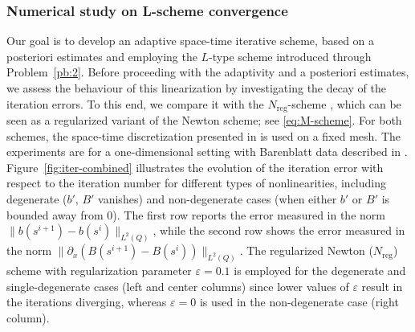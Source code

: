 \documentclass[review,11pt]{article}
\numberwithin{equation}{section}
\def \e  {\varepsilon}
\begin{document}
\subsubsection{Numerical study on L-scheme convergence}\label{sec:numerical_validation}
Our goal is to develop an adaptive space-time iterative scheme, based on a posteriori estimates and employing the $L$-type scheme introduced through Problem~\ref{pb:2}. Before proceeding with the adaptivity and a posteriori estimates, we assess the behaviour of this linearization by investigating the decay of the iteration errors. To this end, we compare it with the $N_{\mathrm{reg}}$-scheme
\cite{mitra2019modified,javed2025robust}, which can be seen as a regularized variant of the Newton scheme; see \eqref{eq:M-scheme}. For both schemes, the space-time discretization presented in  is used on a fixed mesh. The experiments are for a one-dimensional setting with Barenblatt data described in .
Figure~\ref{fig:iter-combined} illustrates the evolution of the iteration error with respect to the iteration number for different types of nonlinearities, including degenerate ($b'$, $B'$ vanishes) and non-degenerate cases (when either $b'$ or $B'$ is bounded away from 0). The first row reports the error measured in the norm $\|b(s^{i+1})-b(s^i)\|_{L^2(Q)}$, while the second row shows the error measured in the norm $\|\partial_x(B(s^{i+1})-B(s^i))\|_{L^2(Q)}$. The regularized Newton ($N_{\mathrm{reg}}$) scheme with regularization parameter $\e=0.1$ is employed for the degenerate and single-degenerate cases (left and center columns) since lower values of $\e$ result in the iterations diverging, whereas $\e=0$ is used in the non-degenerate case (right column).
\end{document}
